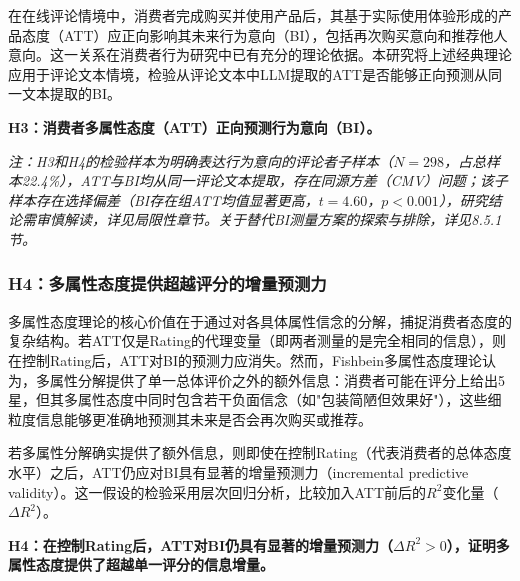 在在线评论情境中，消费者完成购买并使用产品后，其基于实际使用体验形成的产品态度（ATT）应正向影响其未来行为意向（BI），包括再次购买意向和推荐他人意向。这一关系在消费者行为研究中已有充分的理论依据\cite{fishbein1975}。本研究将上述经典理论应用于评论文本情境，检验从评论文本中LLM提取的ATT是否能够正向预测从同一文本提取的BI。

\textbf{H3：消费者多属性态度（ATT）正向预测行为意向（BI）。}

\textit{注：H3和H4的检验样本为明确表达行为意向的评论者子样本（$N=298$，占总样本22.4\%），ATT与BI均从同一评论文本提取，存在同源方差（CMV）问题；该子样本存在选择偏差（BI存在组ATT均值显著更高，$t=4.60$，$p<0.001$），研究结论需审慎解读，详见局限性章节。关于替代BI测量方案的探索与排除，详见8.5.1节。}

\subsubsection{H4：多属性态度提供超越评分的增量预测力}

多属性态度理论的核心价值在于通过对各具体属性信念的分解，捕捉消费者态度的复杂结构。若ATT仅是Rating的代理变量（即两者测量的是完全相同的信息），则在控制Rating后，ATT对BI的预测力应消失。然而，Fishbein多属性态度理论\cite{fishbein1975}认为，多属性分解提供了单一总体评价之外的额外信息：消费者可能在评分上给出5星，但其多属性态度中同时包含若干负面信念（如"包装简陋但效果好"），这些细粒度信息能够更准确地预测其未来是否会再次购买或推荐。

若多属性分解确实提供了额外信息，则即使在控制Rating（代表消费者的总体态度水平）之后，ATT仍应对BI具有显著的增量预测力（incremental predictive validity）。这一假设的检验采用层次回归分析，比较加入ATT前后的$R^2$变化量（$\Delta R^2$）。

\textbf{H4：在控制Rating后，ATT对BI仍具有显著的增量预测力（$\Delta R^2>0$），证明多属性态度提供了超越单一评分的信息增量。}
